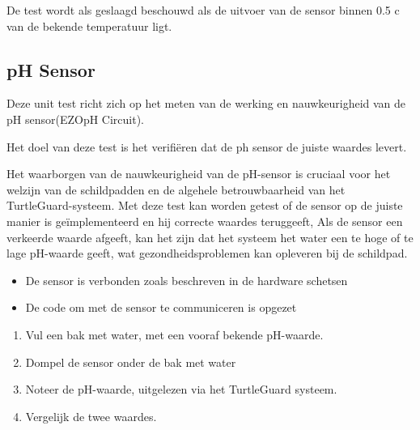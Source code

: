 \documentclass[a4paper]{report}
\newcommand{\turtleguard}{\mbox{TurtleGuard\texttrademark}\xspace}
\begin{document}
\begin{tcolorbox}[colback=white, colframe=black, title=Slagingscriteria]
De test wordt als geslaagd beschouwd als de uitvoer van de sensor binnen 0.5 \textdegree c van de bekende temperatuur ligt.
\end{tcolorbox}


\subsection{pH Sensor}

\begin{tcolorbox}[colback=white, colframe=black, title=Beschrijving van de Unit]
Deze unit test richt zich op het meten van de werking en nauwkeurigheid van de pH sensor(EZO\texttrademark pH Circuit). 
\end{tcolorbox}

\begin{tcolorbox}[colback=white, colframe=black, title=Test Doel]
Het doel van deze test is het verifiëren dat de ph sensor de juiste waardes levert.
\end{tcolorbox}

\begin{tcolorbox}[colback=white, colframe=black, title=Test Motivatie]
Het waarborgen van de nauwkeurigheid van de pH-sensor is cruciaal voor het welzijn van de schildpadden en de algehele betrouwbaarheid van het \turtleguard-systeem.
Met deze test kan worden getest of de sensor op de juiste manier is geïmplementeerd en hij correcte waardes teruggeeft,
Als de sensor een verkeerde waarde afgeeft, kan het zijn dat het systeem het water een te hoge of te lage pH-waarde geeft, wat gezondheidsproblemen kan opleveren bij de schildpad.
\end{tcolorbox}

\begin{tcolorbox}[colback=white, colframe=black, title=Test Criteria]
  \begin{itemize}
    \item De sensor is verbonden zoals beschreven in de hardware schetsen 
    \item De code om met de sensor te communiceren is opgezet 
  \end{itemize}
\end{tcolorbox}

\begin{tcolorbox}[colback=white, colframe=black, title=Test Stappen]
  \begin{enumerate}
    \item Vul een bak met water, met een vooraf bekende pH-waarde.
    \item Dompel de sensor onder de bak met water 
    \item Noteer de pH-waarde, uitgelezen via het \turtleguard systeem. 
    \item Vergelijk de twee waardes. 
  \end{enumerate}
\end{tcolorbox}
\end{document}
